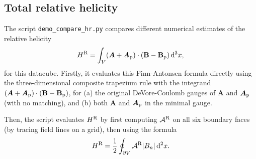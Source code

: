 \documentclass[11pt]{article}
\newcommand{\Ab}{\boldsymbol{A}}
\begin{document}
\subsection{Total relative helicity}

The script \texttt{demo\_compare\_hr.py} compares different numerical estimates of the relative helicity
\begin{equation}
H^{\rm R} = \int_V(\Ab + \Ab_{\rm p})\cdot({\bf B} - {\bf B}_{\rm p})\,\mathrm{d}^3x,
\end{equation}
for this datacube. Firstly, it evaluates this Finn-Antonsen formula directly using the three-dimensional composite trapezium rule with the integrand $(\Ab + \Ab_{\rm p})\cdot({\bf B} - {\bf B}_{\rm p})$, for (a) the original DeVore-Coulomb gauges of $\Ab$ and $\Ab_{\rm p}$ (with no matching), and (b) both $\Ab$ and $\Ab_{\rm p}$ in the minimal gauge.

Then, the script evaluates $H^{\rm R}$ by first computing $\mathcal{A}^{\rm R}$ on all six boundary faces (by tracing field lines on a grid), then using the formula
\begin{equation}
H^{\rm R} = \frac{1}{2}\oint_{\partial V}\mathcal{A}^{\rm R}|B_n|\,\mathrm{d}^2x.
\end{equation}



\end{document}
